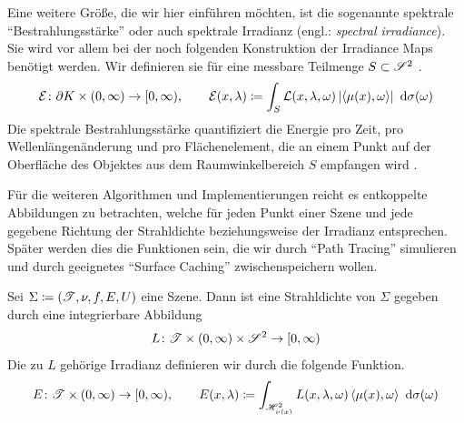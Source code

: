 		Eine weitere Größe, die wir hier einführen möchten, ist die sogenannte spektrale \enquote{Bestrahlungsstärke} oder auch spektrale Irradianz (engl.: \textit{spectral irradiance}).
		Sie wird vor allem bei der noch folgenden Konstruktion der Irradiance Maps benötigt werden.
		Wir definieren sie für eine messbare Teilmenge $S\subset\mathscr{S}^{2}$ \cite[S.~9~f]{guide-radiometry}.
		\[
			\mathcal{E}\colon\partial K\times (0,\infty)\to[0,\infty),\qquad \mathcal{E}(x,\lambda) \coloneqq \int_{S}^{}  \mathcal{L}(x,\lambda,\omega)\left\vert \left\langle \mu(x),\omega \right\rangle \right\vert \ \mathrm{d} \sigma(\omega)
		\]
		Die spektrale Bestrahlungsstärke quantifiziert die Energie pro Zeit, pro Wellenlängenänderung und pro Flächenelement, die an einem Punkt auf der Oberfläche des Objektes aus dem Raumwinkelbereich $S$ empfangen wird \cite{intro-radiometry,guide-radiometry}.

		Für die weiteren Algorithmen und Implementierungen reicht es entkoppelte Abbildungen zu betrachten, welche für jeden Punkt einer Szene und jede gegebene Richtung der Strahldichte beziehungsweise der Irradianz entsprechen.
		Später werden dies die Funktionen sein, die wir durch \enquote{Path Tracing} simulieren und durch geeignetes \enquote{Surface Caching} zwischenspeichern wollen.
		\begin{definition}
			Sei $\Sigma\coloneqq (\mathscr{T},\nu,f,E,U)$ eine Szene.
			Dann ist eine Strahldichte von $\Sigma$ gegeben durch eine integrierbare Abbildung
			\[
				L\colon\mathscr{T}\times(0,\infty)\times\mathscr{S}^{2}\to[0,\infty)
			\]
			Die zu $L$ gehörige Irradianz definieren wir durch die folgende Funktion.
			\[
				E\colon\mathscr{T}\times(0,\infty)\to[0,\infty),\qquad E(x,\lambda)\coloneqq \int_{\mathscr{H}^{2}_{\nu(x)}}^{} L(x,\lambda,\omega)\left\langle \mu(x),\omega \right\rangle\ \mathrm{d} \sigma(\omega)
			\]
		\end{definition}






